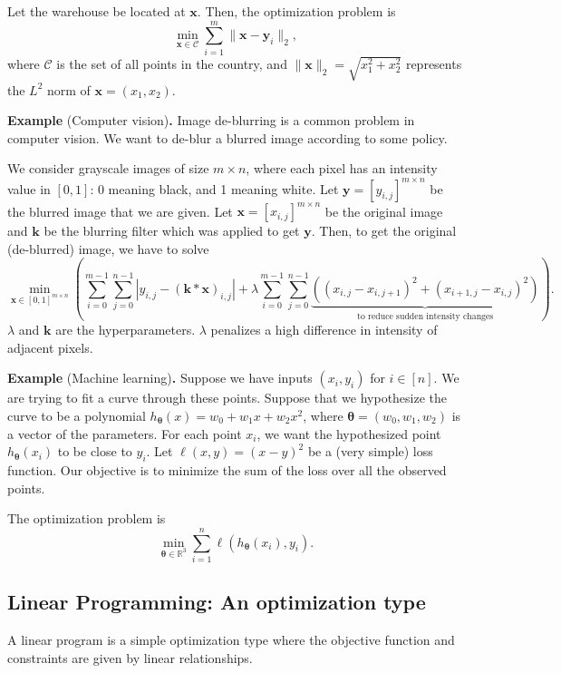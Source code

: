 \documentclass[twoside]{article}
\newcommand\R{\mathbb{R}}
\begin{document}
Let the warehouse be located at $\mathbf{x}.$ Then, the optimization problem is
\[
    \min_{\mathbf{x} \in \mathscr{C}}
        \sum_{i = 1}^{m} \|\mathbf{x} - \mathbf{y}_i\|_2,
\] where $\mathscr{C}$ is the set of all points in the country, and
$\| \mathbf{x} \|_2 = \sqrt{x_1^2 + x_2^2}$ represents the $L^2$ norm of
$\mathbf{x} = (x_1, x_2).$


\textbf{Example} (Computer vision)\textbf{.} Image de-blurring is a common
problem in computer vision. We want to de-blur a blurred image according to some
policy.

We consider grayscale images of size $m \times n$, where each pixel has an
intensity value in $[0, 1]$: 0 meaning black, and 1 meaning white.  Let
$\mathbf{y} = [y_{i, j}]^{m \times n}$ be the blurred image that we are given.
Let $\mathbf{x} = [x_{i, j}]^{m \times n}$ be the original image and
$\mathbf{k}$ be the blurring filter which was applied to get $\mathbf{y}$.
Then, to get the original (de-blurred) image, we have to solve \[
    \min_{\mathbf{x} \in [0, 1]^{m \times n}}
    \left(
        \sum_{i = 0}^{m - 1} \sum_{j = 0}^{n - 1}
            |y_{i, j} - (\mathbf{k} * \mathbf{x})_{i, j}|
        + \lambda \sum_{i = 0}^{m - 1} \sum_{j = 0}^{n - 1}
            \underbrace{
                \left((x_{i, j} - x_{i, j + 1})^2
                      + (x_{i + 1, j} - x_{i, j})^2\right)
            }_{
                \text{to reduce sudden intensity changes}
            }
    \right).
\] $\lambda$ and $\mathbf{k}$ are the hyperparameters. $\lambda$ penalizes a
high difference in intensity of adjacent pixels.

\textbf{Example} (Machine learning)\textbf{.} Suppose we have inputs
$(x_i, y_i)$ for $i \in [n].$ We are trying to fit a curve through these points.
Suppose that we hypothesize the curve to be a polynomial
$h_{\boldsymbol{\theta}}(x) = w_0 + w_1x + w_2x^2$, where
$\boldsymbol\theta = (w_0, w_1, w_2)$ is a vector of the parameters. For each
point $x_i$, we want the hypothesized point $h_{\boldsymbol{\theta}}(x_i)$ to be
close to $y_i$. Let $\ell(x, y) = (x - y)^2$ be a (very simple) loss function.
Our objective is to minimize the sum of the loss over all the observed points.

The optimization problem is \[
    \min_{\boldsymbol{\theta} \in \R^3}
        \sum_{i = 1}^{n} \ell(h_{\boldsymbol{\theta}}(x_i), y_i).
\]

\subsection{Linear Programming: An optimization type}
A linear program is a simple optimization type where the objective function and
constraints are given by linear relationships.
\end{document}
